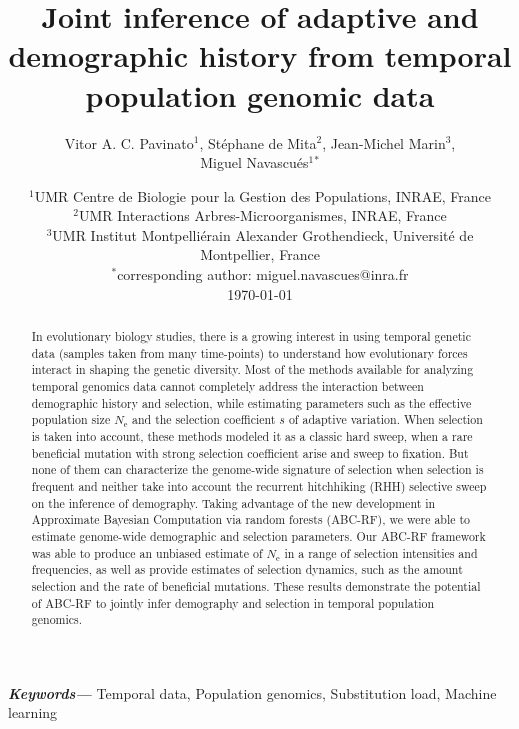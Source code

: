 \documentclass[a4paper, 12pt]{article}
\title{Joint inference of adaptive and demographic history from temporal population genomic data}
\author{Vitor A. C. Pavinato$^1$, Stéphane de Mita$^2$, Jean-Michel Marin$^3$, \\
			Miguel Navascués$^1$$^*$}
\date{{\myfont %
    $^1$UMR Centre de Biologie pour la Gestion des Populations, INRAE, France\\%
    $^2$UMR Interactions Arbres-Microorganismes, INRAE, France \\%
    $^3$UMR Institut Montpelliérain Alexander Grothendieck, Université de Montpellier, France\\%
    $^*$corresponding author: miguel.navascues@inra.fr\\[2ex]%
    }
    \today    
}
\providecommand{\keywords}[1]
{
  \small	
  \textbf{\textit{Keywords---}} #1
}
\begin{document}
\maketitle

\begin{abstract}
In evolutionary biology studies, there is a growing interest in using temporal genetic data (samples taken from many time-points) to understand how evolutionary forces interact in shaping the genetic diversity. Most of the methods available for analyzing temporal genomics data cannot completely address the interaction between demographic history and selection, while estimating parameters such as the effective population size $N_{\mathrm{e}}$ and the selection coefficient $s$ of adaptive variation. When selection is taken into account, these methods modeled it as a classic hard sweep, when a rare beneficial mutation with strong selection coefficient arise and sweep to fixation. But none of them can characterize the genome-wide signature of selection when selection is frequent and neither take into account the recurrent hitchhiking (RHH) selective sweep on the inference of demography. Taking advantage of the new development in Approximate Bayesian Computation via random forests (ABC-RF), we were able to estimate genome-wide demographic and selection parameters. Our ABC-RF framework was able to produce an unbiased estimate of $N_{\mathrm{e}}$ in a range of selection intensities and frequencies, as well as provide estimates of selection dynamics, such as the amount selection and the rate of beneficial mutations. These results demonstrate the potential of ABC-RF to jointly infer demography and selection in temporal population genomics.
\end{abstract} \hspace{10pt}

\keywords{Temporal data, Population genomics, Substitution load, Machine learning}

\newpage
\end{document}
